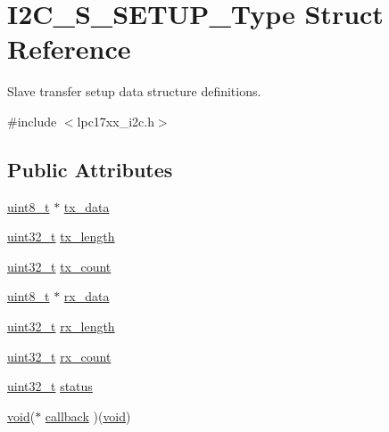 \hypertarget{struct_i2_c___s___s_e_t_u_p___type}{}\section{I2\+C\+\_\+\+S\+\_\+\+S\+E\+T\+U\+P\+\_\+\+Type Struct Reference}
\label{struct_i2_c___s___s_e_t_u_p___type}


Slave transfer setup data structure definitions.  




{\ttfamily \#include $<$lpc17xx\+\_\+i2c.\+h$>$}

\subsection*{Public Attributes}
\begin{DoxyCompactItemize}
\item 
\hyperlink{_p_e___types_8h_aba7bc1797add20fe3efdf37ced1182c5}{uint8\+\_\+t} $\ast$ \hyperlink{struct_i2_c___s___s_e_t_u_p___type_a229ec9ad1b82bcaf5e71630f63b665ad}{tx\+\_\+data}
\item 
\hyperlink{_p_e___types_8h_a33594304e786b158f3fb30289278f5af}{uint32\+\_\+t} \hyperlink{struct_i2_c___s___s_e_t_u_p___type_ad21f72ab1857d2701a3ebfd2a925dbb8}{tx\+\_\+length}
\item 
\hyperlink{_p_e___types_8h_a33594304e786b158f3fb30289278f5af}{uint32\+\_\+t} \hyperlink{struct_i2_c___s___s_e_t_u_p___type_a968b88959698082dad533dd81e43656c}{tx\+\_\+count}
\item 
\hyperlink{_p_e___types_8h_aba7bc1797add20fe3efdf37ced1182c5}{uint8\+\_\+t} $\ast$ \hyperlink{struct_i2_c___s___s_e_t_u_p___type_aeed334f26b9cca81f76351a38ddc4925}{rx\+\_\+data}
\item 
\hyperlink{_p_e___types_8h_a33594304e786b158f3fb30289278f5af}{uint32\+\_\+t} \hyperlink{struct_i2_c___s___s_e_t_u_p___type_ad0b62497c002a48eb3872a3955d66070}{rx\+\_\+length}
\item 
\hyperlink{_p_e___types_8h_a33594304e786b158f3fb30289278f5af}{uint32\+\_\+t} \hyperlink{struct_i2_c___s___s_e_t_u_p___type_a63f72aed2db5a0faa6fe4c55b6777781}{rx\+\_\+count}
\item 
\hyperlink{_p_e___types_8h_a33594304e786b158f3fb30289278f5af}{uint32\+\_\+t} \hyperlink{struct_i2_c___s___s_e_t_u_p___type_ad8439ad083dc96c994cb0cf94755e87f}{status}
\item 
\hyperlink{usb__devapi_8h_afabf60e7f57651d6d595a02c75f07cd0}{void}($\ast$ \hyperlink{struct_i2_c___s___s_e_t_u_p___type_aba1fe7a9b97729abb130e7a9558964db}{callback} )(\hyperlink{usb__devapi_8h_afabf60e7f57651d6d595a02c75f07cd0}{void})
\end{DoxyCompactItemize}


